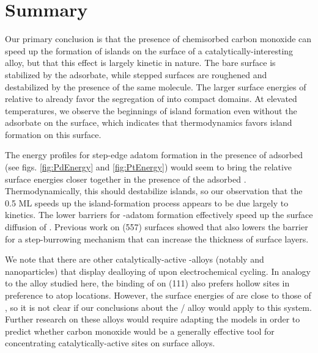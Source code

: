 \section{Summary}

Our primary conclusion is that the presence of chemisorbed carbon
monoxide can speed up the formation of  islands on the surface
of a catalytically-interesting alloy, but that this effect is largely
kinetic in nature.  The bare  surface is stabilized by the
 adsorbate, while stepped  surfaces are roughened and
destabilized by the presence of the same molecule. The larger surface
energies of  relative to  already favor the segregation
of  into compact domains.  At elevated temperatures, we observe
the beginnings of island formation even without the  adsorbate
on the surface, which indicates that thermodynamics favors island
formation on this surface.

The energy profiles for step-edge adatom formation in the presence of
adsorbed  (see figs. \ref{fig:PdEnergy} and \ref{fig:PtEnergy})
would seem to bring the relative surface energies closer together in
the presence of the adsorbed . Thermodynamically, this should
destabilize  islands, so our observation that the 0.5 ML
 speeds up the island-formation process appears to be due
largely to kinetics.  The lower barriers for -adatom formation
effectively speed up the surface diffusion of .  Previous work
on (557) surfaces showed that  also lowers the barrier
for a step-burrowing mechanism that can increase the thickness of
 surface layers.\citep{Michalka:2013}

We note that there are other catalytically-active -alloys
(notably  and  nanoparticles) that display
dealloying of  upon electrochemical cycling.\citep{Tuaev:2013fk}
In analogy to the  alloy studied here, the binding of 
on (111) also prefers hollow sites in preference to atop
locations.\citep{Campuzano:1979uq} However, the surface energies of
 are close to those of , so it is not clear if our
conclusions about the / alloy would apply to this
system.  Further research on these alloys would require adapting the
 models in order to predict whether carbon monoxide
would be a generally effective tool for concentrating
catalytically-active  sites on surface alloys.


